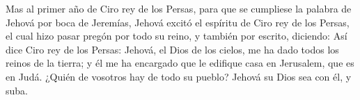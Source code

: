  Mas al primer año de Ciro rey de los Persas, para que se
cumpliese la palabra de Jehová por boca de Jeremías, Jehová excitó el
espíritu de Ciro rey de los Persas, el cual hizo pasar pregón por todo
su reino, y también por escrito, diciendo:  Así dice Ciro
rey de los Persas: Jehová, el Dios de los cielos, me ha dado todos los
reinos de la tierra; y él me ha encargado que le edifique casa en
Jerusalem, que es en Judá. ¿Quién de vosotros hay de todo su pueblo?
Jehová su Dios sea con él, y suba.
